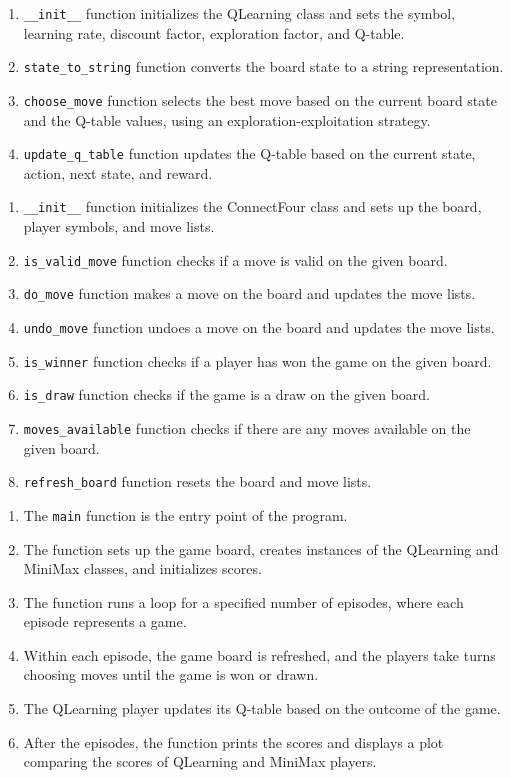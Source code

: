 \documentclass{article}
\begin{document}
\begin{enumerate}
    \item \texttt{\_\_init\_\_} function initializes the QLearning class and sets the symbol, learning rate, discount factor, exploration factor, and Q-table.
    \item \texttt{state\_to\_string} function converts the board state to a string representation.
    \item \texttt{choose\_move} function selects the best move based on the current board state and the Q-table values, using an exploration-exploitation strategy.
    \item \texttt{update\_q\_table} function updates the Q-table based on the current state, action, next state, and reward.
\end{enumerate}
\begin{enumerate}
    \item \texttt{\_\_init\_\_} function initializes the ConnectFour class and sets up the board, player symbols, and move lists.
    \item \texttt{is\_valid\_move} function checks if a move is valid on the given board.
    \item \texttt{do\_move} function makes a move on the board and updates the move lists.
    \item \texttt{undo\_move} function undoes a move on the board and updates the move lists.
    \item \texttt{is\_winner} function checks if a player has won the game on the given board.
    \item \texttt{is\_draw} function checks if the game is a draw on the given board.
    \item \texttt{moves\_available} function checks if there are any moves available on the given board.
    \item \texttt{refresh\_board} function resets the board and move lists.
\end{enumerate}
\begin{enumerate}
    \item The \texttt{main} function is the entry point of the program.
    \item The function sets up the game board, creates instances of the QLearning and MiniMax classes, and initializes scores.
    \item The function runs a loop for a specified number of episodes, where each episode represents a game.
    \item Within each episode, the game board is refreshed, and the players take turns choosing moves until the game is won or drawn.
    \item The QLearning player updates its Q-table based on the outcome of the game.
    \item After the episodes, the function prints the scores and displays a plot comparing the scores of QLearning and MiniMax players.
\end{enumerate}
\end{document}
